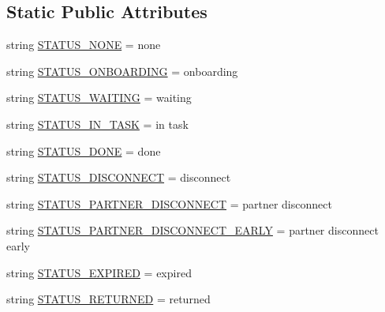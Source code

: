 \subsection*{Static Public Attributes}
\begin{DoxyCompactItemize}
\item 
string \hyperlink{classparlai_1_1mturk_1_1core_1_1legacy__2018_1_1agents_1_1AssignState_a8cba84a272dbf5ce2fb7684d00f99122}{S\+T\+A\+T\+U\+S\+\_\+\+N\+O\+NE} = \textquotesingle{}none\textquotesingle{}
\item 
string \hyperlink{classparlai_1_1mturk_1_1core_1_1legacy__2018_1_1agents_1_1AssignState_a21035c460376b3bff40f86a6dde82dfd}{S\+T\+A\+T\+U\+S\+\_\+\+O\+N\+B\+O\+A\+R\+D\+I\+NG} = \textquotesingle{}onboarding\textquotesingle{}
\item 
string \hyperlink{classparlai_1_1mturk_1_1core_1_1legacy__2018_1_1agents_1_1AssignState_ae3a8287c8a69502c98dd9792d6c98da8}{S\+T\+A\+T\+U\+S\+\_\+\+W\+A\+I\+T\+I\+NG} = \textquotesingle{}waiting\textquotesingle{}
\item 
string \hyperlink{classparlai_1_1mturk_1_1core_1_1legacy__2018_1_1agents_1_1AssignState_a0cb3f988ec77aa06d9764f0acfce34b8}{S\+T\+A\+T\+U\+S\+\_\+\+I\+N\+\_\+\+T\+A\+SK} = \textquotesingle{}in task\textquotesingle{}
\item 
string \hyperlink{classparlai_1_1mturk_1_1core_1_1legacy__2018_1_1agents_1_1AssignState_af7a1754d874f5445266be617081920c5}{S\+T\+A\+T\+U\+S\+\_\+\+D\+O\+NE} = \textquotesingle{}done\textquotesingle{}
\item 
string \hyperlink{classparlai_1_1mturk_1_1core_1_1legacy__2018_1_1agents_1_1AssignState_a465e7476bd1b3ec4840e65107c3318db}{S\+T\+A\+T\+U\+S\+\_\+\+D\+I\+S\+C\+O\+N\+N\+E\+CT} = \textquotesingle{}disconnect\textquotesingle{}
\item 
string \hyperlink{classparlai_1_1mturk_1_1core_1_1legacy__2018_1_1agents_1_1AssignState_a0781ceb4a6e0f94554c484f795144855}{S\+T\+A\+T\+U\+S\+\_\+\+P\+A\+R\+T\+N\+E\+R\+\_\+\+D\+I\+S\+C\+O\+N\+N\+E\+CT} = \textquotesingle{}partner disconnect\textquotesingle{}
\item 
string \hyperlink{classparlai_1_1mturk_1_1core_1_1legacy__2018_1_1agents_1_1AssignState_afd3b205af858c34233b6c7fd70b37513}{S\+T\+A\+T\+U\+S\+\_\+\+P\+A\+R\+T\+N\+E\+R\+\_\+\+D\+I\+S\+C\+O\+N\+N\+E\+C\+T\+\_\+\+E\+A\+R\+LY} = \textquotesingle{}partner disconnect early\textquotesingle{}
\item 
string \hyperlink{classparlai_1_1mturk_1_1core_1_1legacy__2018_1_1agents_1_1AssignState_ac8588c251ab127e82619f90a8c504700}{S\+T\+A\+T\+U\+S\+\_\+\+E\+X\+P\+I\+R\+ED} = \textquotesingle{}expired\textquotesingle{}
\item 
string \hyperlink{classparlai_1_1mturk_1_1core_1_1legacy__2018_1_1agents_1_1AssignState_a566028afa81fa540eae83268460b97e4}{S\+T\+A\+T\+U\+S\+\_\+\+R\+E\+T\+U\+R\+N\+ED} = \textquotesingle{}returned\textquotesingle{}
\end{DoxyCompactItemize}


